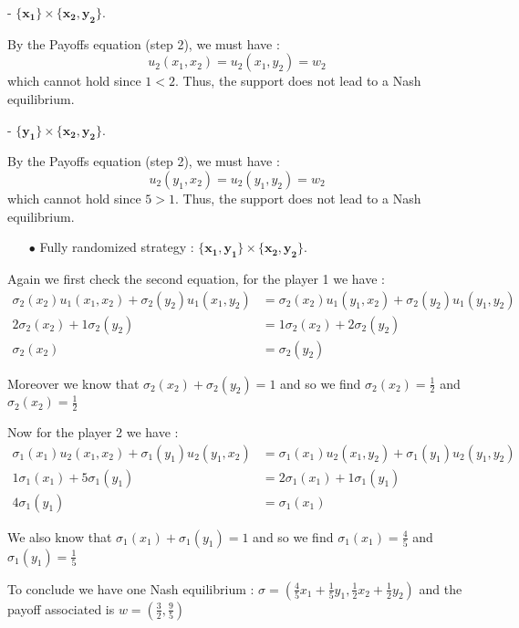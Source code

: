 - $\mathbf{\{x_1\}}\times\mathbf{\{x_2,y_2\}}$.

By the Payoffs equation (step 2), we must have :
 \begin{equation*}
    u_2(x_1,x_2)=u_2(x_1,y_2)=w_2
\end{equation*}
which cannot hold since $1<2$. Thus, the support does not lead to a Nash equilibrium.

- $\mathbf{\{y_1\}}\times\mathbf{\{x_2,y_2\}}$.

By the Payoffs equation (step 2), we must have :
 \begin{equation*}
    u_2(y_1,x_2)=u_2(y_1,y_2)=w_2
\end{equation*}
which cannot hold since $5>1$. Thus, the support does not lead to a Nash equilibrium.


\begin{itemize}
  \item[$\bullet$] Fully randomized strategy : $\mathbf{\{x_1,y_1\}}\times\mathbf{\{x_2,y_2\}}$.
\end{itemize}
Again we first check the second equation, for the player 1 we have : 
\begin{align*}
 \sigma_2(x_2)u_1(x_1,x_2) + \sigma_2(y_2)u_1(x_1,y_2) &= \sigma_2(x_2)u_1(y_1,x_2) + \sigma_2(y_2)u_1(y_1,y_2) \\
 2\sigma_2(x_2)+1\sigma_2(y_2)&= 1\sigma_2(x_2) + 2\sigma_2(y_2) \\
 \sigma_2(x_2)&=\sigma_2(y_2)
\end{align*}

Moreover we know that $\sigma_2(x_2) + \sigma_2(y_2) = 1$ and so we find $\sigma_2(x_2)=\frac{1}{2}$ and $\sigma_2(x_2)=\frac{1}{2}$

Now for the player 2 we have : 
\begin{align*}
 \sigma_1(x_1)u_2(x_1,x_2) + \sigma_1(y_1)u_2(y_1,x_2) &= \sigma_1(x_1)u_2(x_1,y_2) + \sigma_1(y_1)u_2(y_1,y_2) \\
 1\sigma_1(x_1)+5\sigma_1(y_1)&= 2\sigma_1(x_1) + 1\sigma_1(y_1) \\
 4\sigma_1(y_1)&=\sigma_1(x_1)
\end{align*}

We also know that $\sigma_1(x_1) + \sigma_1(y_1) = 1$ and so we find $\sigma_1(x_1)=\frac{4}{5}$ and $\sigma_1(y_1)=\frac{1}{5}$

To conclude we have one Nash equilibrium :
$\sigma = \left( \frac{4}{5}x_1 + \frac{1}{5}y_1, \frac{1}{2}x_2 + \frac{1}{2}y_2\right)$ and the payoff associated is $w= \left(\frac{3}{2},\frac{9}{5}\right)$
        
